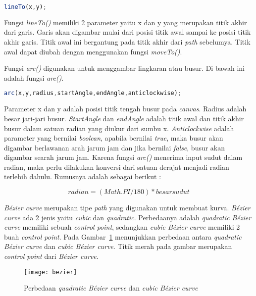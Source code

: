 \begin{lstlisting}[language=Javascript, caption=Fungsi \textit{lineTo()}]
	lineTo(x,y);
\end{lstlisting}

Fungsi \textit{lineTo()} memiliki 2 parameter yaitu x dan y yang merupakan titik akhir dari garis. Garis akan digambar mulai dari posisi titik awal sampai ke posisi titik akhir garis. Titik awal ini bergantung pada titik akhir dari \textit{path} sebelumya. Titik awal dapat diubah dengan menggunakan fungsi \textit{moveTo()}.

Fungsi \textit{arc()} digunakan untuk menggambar lingkaran atau busur. Di bawah ini adalah fungsi \textit{arc()}.

\begin{lstlisting}[language=Javascript, caption=Fungsi \textit{arc()}]
	arc(x,y,radius,startAngle,endAngle,anticlockwise);
\end{lstlisting}

Parameter x dan y adalah posisi titik tengah busur pada \textit{canvas}. Radius adalah besar jari-jari busur. \textit{StartAngle} dan \textit{endAngle} adalah titik awal dan titik akhir busur dalam satuan radian yang diukur dari sumbu x. \textit{Anticlockwise} adalah parameter yang bernilai \textit{boolean}, apabila bernilai \textit{true}, maka busur akan digambar berlawanan arah jarum jam dan jika bernilai \textit{false}, busur akan digambar searah jarum jam. Karena fungsi \textit{arc()} menerima input sudut dalam radian, maka perlu dilakukan konversi dari satuan derajat menjadi radian terlebih dahulu. Rumusnya adalah sebagai berikut :

\begin{displaymath}
	radian = (Math.PI / 180) * besar sudut
\end{displaymath}	

\textit{B\'ezier curve} merupakan tipe \textit{path} yang digunakan untuk membuat kurva. \textit{B\'ezier curve} ada 2 jenis yaitu \textit{cubic} dan \textit{quadratic}. Perbedaanya adalah \textit{quadratic B\'ezier curve} memiliki sebuah \textit{control point}, sedangkan \textit{cubic B\'ezier curve} memiliki 2 buah \textit{control point}. Pada Gambar~\ref{fig:bezier} menunjukkan perbedaan antara \textit{quadratic B\'ezier curve} dan \textit{cubic B\'ezier curve}. Titik merah pada gambar merupakan \textit{control point} dari \textit{B\'ezier curve}.

\begin{figure}[H]
	\centering  
	\texttt{[image: bezier]}
	\caption[Perbedaan \textit{quadratic B\'ezier curve} dan \textit{cubic B\'ezier curve}]{Perbedaan \textit{quadratic B\'ezier curve} dan \textit{cubic B\'ezier curve}\cite{MDN:05:Web}}
	\label{fig:bezier} 
\end{figure} 

